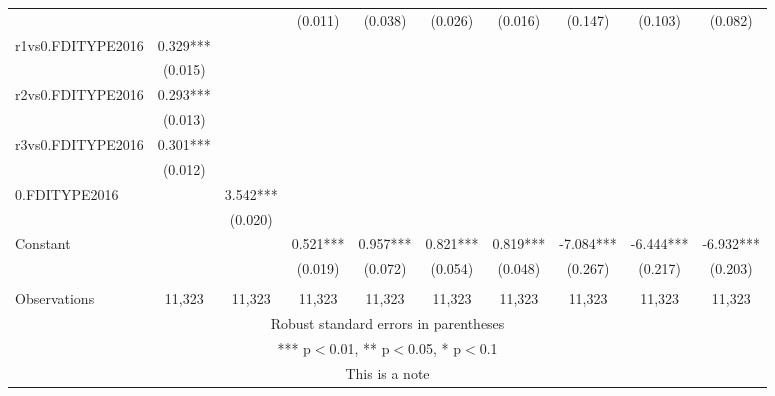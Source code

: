 \documentclass[]{article}
\begin{document}
\begin{tabular}{lccccccccc}
 &  &  & (0.011) & (0.038) & (0.026) & (0.016) & (0.147) & (0.103) & (0.082) \\
r1vs0.FDITYPE2016 & 0.329*** &  &  &  &  &  &  &  &  \\
 & (0.015) &  &  &  &  &  &  &  &  \\
r2vs0.FDITYPE2016 & 0.293*** &  &  &  &  &  &  &  &  \\
 & (0.013) &  &  &  &  &  &  &  &  \\
r3vs0.FDITYPE2016 & 0.301*** &  &  &  &  &  &  &  &  \\
 & (0.012) &  &  &  &  &  &  &  &  \\
0.FDITYPE2016 &  & 3.542*** &  &  &  &  &  &  &  \\
 &  & (0.020) &  &  &  &  &  &  &  \\
Constant &  &  & 0.521*** & 0.957*** & 0.821*** & 0.819*** & -7.084*** & -6.444*** & -6.932*** \\
 &  &  & (0.019) & (0.072) & (0.054) & (0.048) & (0.267) & (0.217) & (0.203) \\
 &  &  &  &  &  &  &  &  &  \\
 Observations & 11,323 & 11,323 & 11,323 & 11,323 & 11,323 & 11,323 & 11,323 & 11,323 & 11,323 \\ \hline
\multicolumn{10}{c}{ Robust standard errors in parentheses} \\
\multicolumn{10}{c}{ *** p$<$0.01, ** p$<$0.05, * p$<$0.1} \\
\multicolumn{10}{c}{ This is a note} \\
\end{tabular}
\end{document}
